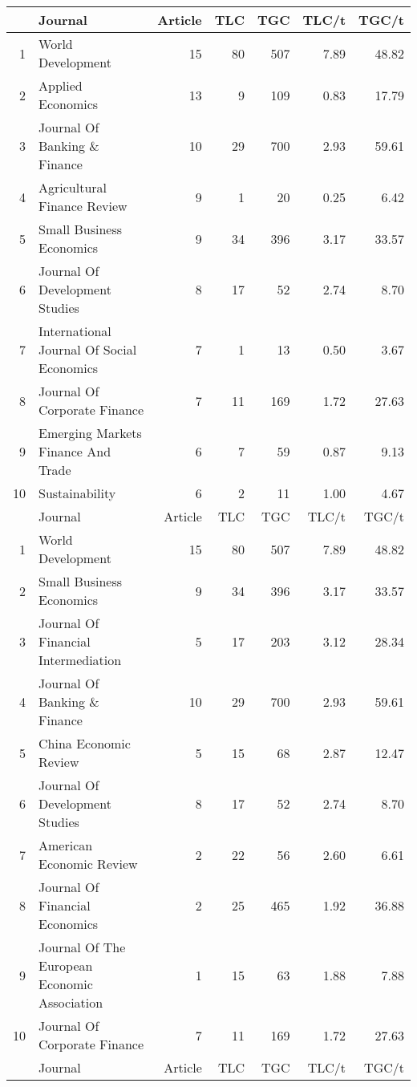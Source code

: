 \begin{table}[ht]
	\centering
    \footnotesize 
	\begin{tabular}{rlrrrrr}
		
		  \toprule
		& Journal & Article & TLC & TGC & TLC/t & TGC/t \\ 
		\midrule
	1 & World Development &  15 &  80 & 507 & 7.89 & 48.82 \\ 
	2 & Applied Economics &  13 &   9 & 109 & 0.83 & 17.79 \\ 
	3 & Journal Of Banking \& Finance &  10 &  29 & 700 & 2.93 & 59.61 \\ 
	4 & Agricultural Finance Review &   9 &   1 &  20 & 0.25 & 6.42 \\ 
	5 & Small Business Economics &   9 &  34 & 396 & 3.17 & 33.57 \\ 
	6 & Journal Of Development Studies &   8 &  17 &  52 & 2.74 & 8.70 \\ 
	7 & International Journal Of Social Economics &   7 &   1 &  13 & 0.50 & 3.67 \\ 
	8 & Journal Of Corporate Finance &   7 &  11 & 169 & 1.72 & 27.63 \\ 
	9 & Emerging Markets Finance And Trade &   6 &   7 &  59 & 0.87 & 9.13 \\ 
	10 & Sustainability &   6 &   2 &  11 & 1.00 & 4.67 \\ 
     	\midrule
		& Journal & Article & TLC & TGC & TLC/t & TGC/t \\ 
		\midrule
	1 & World Development &  15 &  80 & 507 & 7.89 & 48.82 \\ 
	2 & Small Business Economics &   9 &  34 & 396 & 3.17 & 33.57 \\ 
	3 & Journal Of Financial Intermediation &   5 &  17 & 203 & 3.12 & 28.34 \\ 
	4 & Journal Of Banking \& Finance &  10 &  29 & 700 & 2.93 & 59.61 \\ 
	5 & China Economic Review &   5 &  15 &  68 & 2.87 & 12.47 \\ 
	6 & Journal Of Development Studies &   8 &  17 &  52 & 2.74 & 8.70 \\ 
	7 & American Economic Review &   2 &  22 &  56 & 2.60 & 6.61 \\ 
	8 & Journal Of Financial Economics &   2 &  25 & 465 & 1.92 & 36.88 \\ 
	9 & Journal Of The European Economic Association &   1 &  15 &  63 & 1.88 & 7.88 \\ 
	10 & Journal Of Corporate Finance &   7 &  11 & 169 & 1.72 & 27.63 \\ 
		\midrule
		& Journal & Article & TLC & TGC & TLC/t & TGC/t \\ 
		\midrule
		

\end{tabular}
\end{table}
